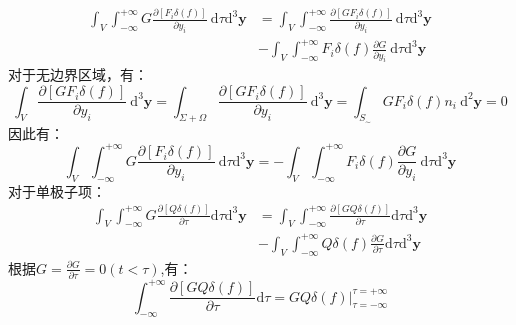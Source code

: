 \begin{enumerate}
\begin{equation}
            \begin{aligned}
                \int_{V} \int_{-\infty}^{+\infty} G \frac{\partial\left[F_{i} \delta(f)\right]}{\partial y_{i}} \mathrm{~d} \tau \mathrm{d}^{3} \mathbf{y} 
                &=\int_{V} \int_{-\infty}^{+\infty} \frac{\partial\left[G F_{i} \delta(f)\right]}{\partial y_{i}} \mathrm{~d} \tau \mathrm{d}^{3} \mathbf{y} \\
                &-\int_{V} \int_{-\infty}^{+\infty} F_{i} \delta(f) \frac{\partial G}{\partial y_{i}} \mathrm{~d} \tau \mathrm{d}^{3} \mathbf{y} 
            \end{aligned}
        \end{equation}
        对于无边界区域，有：
        \begin{equation}
            \int_{V} \frac{\partial\left[G F_{i} \delta(f)\right]}{\partial y_{i}} \mathrm{~d}^{3} \mathbf{y}=\int_{\Sigma+\Omega} \frac{\partial\left[G F_{i} \delta(f)\right]}{\partial y_{i}} \mathrm{~d}^{3} \mathbf{y}=\int_{S_{\sim}} G F_{i} \delta(f) n_{i} \mathrm{~d}^{2} \mathbf{y}=0
        \end{equation}
        因此有：
        \begin{equation}
            \int_{V} \int_{-\infty}^{+\infty} G \frac{\partial\left[F_{i} \delta(f)\right]}{\partial y_{i}} \mathrm{~d} \tau \mathrm{d}^{3} \mathbf{y}
            =-\int_{V} \int_{-\infty}^{+\infty} F_{i} \delta(f) \frac{\partial G}{\partial y_{i}} \mathrm{~d} \tau \mathrm{d}^{3} \mathbf{y}
        \end{equation}
        对于单极子项：
        \begin{equation}
            \begin{aligned}
                \int_{V} \int_{-\infty}^{+\infty} G \frac{\partial[Q \delta(f)]}{\partial \tau} \mathrm{d} \tau \mathrm{d}^{3} \mathbf{y} 
                &=\int_{V} \int_{-\infty}^{+\infty} \frac{\partial[G Q \delta(f)]}{\partial \tau} \mathrm{d} \tau \mathrm{d}^{3} \mathbf{y} \\
                &-\int_{V} \int_{-\infty}^{+\infty} Q \delta(f) \frac{\partial G}{\partial \tau} \mathrm{d} \tau \mathrm{d}^{3} \mathbf{y} 
            \end{aligned}
        \end{equation}
        根据\(G=\frac{\partial G}{\partial \tau}=0 (t<\tau) \),有：
        \begin{equation}
            \int_{-\infty}^{+\infty} \frac{\partial[G Q \delta(f)]}{\partial \tau} \mathrm{d} \tau
            =\left.G Q \delta(f)\right|_{\tau=-\infty} ^{\tau=+\infty}

\end{equation}
\end{enumerate}
